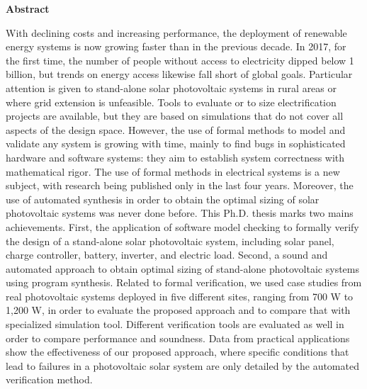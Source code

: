 \thispagestyle{plain}
\begin{center}
%    
%    
%    
    \vspace{0.9cm}
    \textbf{Abstract}
\end{center}
With declining costs and increasing performance, the deployment of renewable energy systems is now growing faster than in the previous decade. In 2017, for the first time, the number of people without access to electricity dipped below 1 billion, but trends on energy access likewise fall short of global goals. Particular attention is given to stand-alone solar photovoltaic systems in rural areas or where grid extension is unfeasible. Tools to evaluate or to size electrification projects are available, but they are based on simulations that do not cover all aspects of the design space. However, the use of formal methods to model and validate any system is growing with time, mainly to find bugs in sophisticated hardware and software systems: they aim to establish system correctness with mathematical rigor. The use of formal methods in electrical systems is a new subject, with research being published only in the last four years.
Moreover, the use of automated synthesis in order to obtain the optimal sizing of solar photovoltaic systems was never done before. This Ph.D. thesis marks two mains achievements. First, the application of software model checking to formally verify the design of a stand-alone solar photovoltaic system, including solar panel, charge controller, battery, inverter, and electric load. Second, a sound and automated approach to obtain optimal sizing of stand-alone photovoltaic systems using program synthesis. Related to formal verification, we used case studies from real photovoltaic systems deployed in five different sites, ranging from 700 W to 1,200 W, in order to evaluate the proposed approach and to compare that with specialized simulation tool. Different verification tools are evaluated as well in order to compare performance and soundness. Data from practical applications show the effectiveness of our proposed approach, where specific conditions that lead to failures in a photovoltaic solar system are only detailed by the automated verification method.
